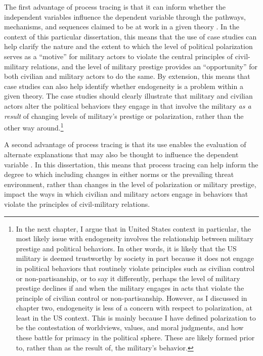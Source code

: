 \documentclass[
  12pt,
  oneside]{memoir}
\begin{document}
The first advantage of process tracing is that it can inform whether the independent variables influence the dependent variable through the pathways, mechanisms, and sequences claimed to be at work in a given theory \autocite[208-209]{brady_rethinking_2010}. In the context of this particular dissertation, this means that the use of case studies can help clarify the nature and the extent to which the level of political polarization serves as a ``motive'' for military actors to violate the central principles of civil-military relations, and the level of military prestige provides an ``opportunity'' for both civilian and military actors to do the same. By extension, this means that case studies can also help identify whether endogeneity is a problem within a given theory. The case studies should clearly illustrate that military and civilian actors alter the political behaviors they engage in that involve the military \emph{as a result} of changing levels of military's prestige or polarization, rather than the other way around.\footnote{In the next chapter, I argue that in United States context in particular, the most likely issue with endogeneity involves the relationship between military prestige and political behaviors. In other words, it is likely that the US military is deemed trustworthy by society in part because it does not engage in political behaviors that routinely violate principles such as civilian control or non-partisanship, or to say it differently, perhaps the level of military prestige declines if and when the military engages in acts that violate the principle of civilian control or non-partisanship. However, as I discussed in chapter two, endogeneity is less of a concern with respect to polarization, at least in the US context. This is mainly because I have defined polarization to be the contestation of worldviews, values, and moral judgments, and how these battle for primacy in the political sphere. These are likely formed prior to, rather than as the result of, the military's behavior.}

A second advantage of process tracing is that its use enables the evaluation of alternate explanations that may also be thought to influence the dependent variable \autocite[208]{brady_rethinking_2010}. In this dissertation, this means that process tracing can help inform the degree to which including changes in either norms or the prevailing threat environment, rather than changes in the level of polarization or military prestige, impact the ways in which civilian and military actors engage in behaviors that violate the principles of civil-military relations.
\end{document}
